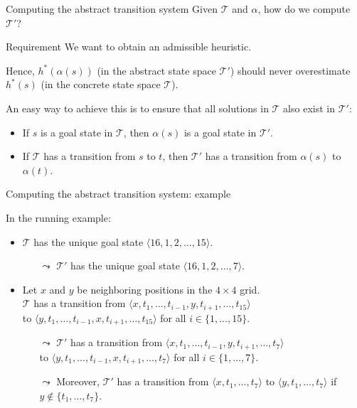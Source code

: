 \documentclass{gkibeamer}
\begin{document}
\begin{frame}{Computing the abstract transition system}
  Given $\mathcal T$ and $\alpha$, how do we compute $\mathcal T'$?

  \begin{block}{Requirement}
    We want to obtain an \alert{admissible heuristic}. 

    Hence, $h^*(\alpha(s))$ (in the abstract state space $\mathcal T'$)
    should never overestimate $h^*(s)$ (in the concrete state space
    $\mathcal T$).
  \end{block}

  \medskip

  An easy way to achieve this is to ensure that \alert{all solutions
    in $\mathcal T$ also exist in $\mathcal T'$}:
  \begin{itemize}
  \item If $s$ is a goal state in $\mathcal T$, then $\alpha(s)$ is a
    goal state in $\mathcal T'$.
  \item If $\mathcal T$ has a transition from $s$ to $t$, then
    $\mathcal T'$ has a transition from $\alpha(s)$ to $\alpha(t)$.
  \end{itemize}
\end{frame}

\begin{frame}{Computing the abstract transition system: example}
  \begin{example}[15-puzzle]
    In the running example:
    \begin{itemize}
    \item $\mathcal T$ has the unique goal state
      $\langle 16, 1, 2, \dots, 15\rangle$.
      \begin{itemize}
      \item[$\leadsto$] $\mathcal T'$ has the unique goal state
        $\langle 16, 1, 2, \dots, 7\rangle$.
      \end{itemize}
    \item Let $x$ and $y$ be neighboring positions in the $4 \times 4$
      grid. \\
      $\mathcal T$ has a transition from
      $\langle x, t_1, \dots, t_{i-1}, y, t_{i+1}, \dots,
      t_{15}\rangle$ \\
      to $\langle y, t_1, \dots, t_{i-1}, x, t_{i+1}, \dots,
      t_{15}\rangle$ for all $i \in \{1, \dots, 15\}$.
      \begin{itemize}
      \item[$\leadsto$]
        $\mathcal T'$ has a transition from
        $\langle x, t_1, \dots, t_{i-1}, y, t_{i+1}, \dots,
        t_7\rangle$ \\
        to $\langle y, t_1, \dots, t_{i-1}, x, t_{i+1}, \dots,
        t_7\rangle$ for all $i \in \{1, \dots, 7\}$.
      \item[$\leadsto$]
        Moreover, $\mathcal T'$ has a transition from
        $\langle x, t_1, \dots, t_7\rangle$ to 
        $\langle y, t_1, \dots, t_7\rangle$ if
        $y \notin \{t_1, \dots, t_7\}$.
      \end{itemize}
    \end{itemize}
  \end{example}
\end{frame}
\end{document}
